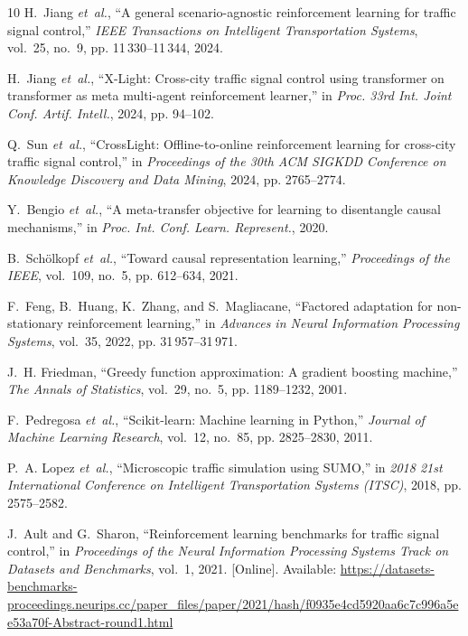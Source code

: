 \documentclass[letterpaper,journal]{IEEEtran}
\begin{document}
\begin{thebibliography}{10}
H.~Jiang \emph{et~al.}, ``A general
  scenario-agnostic reinforcement learning for traffic signal control,''
  \emph{IEEE Transactions on Intelligent Transportation Systems}, vol.~25,
  no.~9, pp. 11\,330--11\,344, 2024.

H.~Jiang \emph{et~al.}, ``{X-Light}: Cross-city traffic signal control using transformer on transformer as meta multi-agent reinforcement learner,'' in \emph{Proc. 33rd Int. Joint Conf. Artif. Intell.}, 2024, pp. 94--102.

Q.~Sun \emph{et~al.}, ``{CrossLight}:
  Offline-to-online reinforcement learning for cross-city traffic signal
  control,'' in \emph{Proceedings of the 30th ACM SIGKDD Conference on
  Knowledge Discovery and Data Mining}, 2024, pp. 2765--2774.

Y.~Bengio \emph{et~al.}, ``A meta-transfer objective for learning to disentangle causal mechanisms,'' in \emph{Proc. Int. Conf. Learn. Represent.}, 2020.

B.~Sch{\"o}lkopf \emph{et~al.}, ``Toward causal representation learning,'' \emph{Proceedings of the IEEE}, vol.~109, no.~5, pp. 612--634, 2021.

F.~Feng, B.~Huang, K.~Zhang, and S.~Magliacane, ``Factored adaptation for non-stationary reinforcement learning,'' in \emph{Advances in Neural Information Processing Systems}, vol.~35, 2022, pp. 31\,957--31\,971.

J.~H. Friedman, ``Greedy function approximation: A gradient boosting machine,''
  \emph{The Annals of Statistics}, vol.~29, no.~5, pp. 1189--1232, 2001.

F.~Pedregosa \emph{et~al.}, ``Scikit-learn: Machine learning in {Python},'' \emph{Journal of Machine Learning Research}, vol.~12, no.~85, pp. 2825--2830, 2011.

P.~A. Lopez \emph{et~al.}, ``Microscopic traffic simulation using {SUMO},'' in \emph{2018 21st
  International Conference on Intelligent Transportation Systems (ITSC)}, 2018,
  pp. 2575--2582.

\BIBentryALTinterwordspacing
J.~Ault and G.~Sharon, ``Reinforcement learning benchmarks for traffic signal
  control,'' in \emph{Proceedings of the Neural Information Processing Systems
  Track on Datasets and Benchmarks}, vol.~1, 2021. [Online]. Available:
  \url{https://datasets-benchmarks-proceedings.neurips.cc/paper_files/paper/2021/hash/f0935e4cd5920aa6c7c996a5ee53a70f-Abstract-round1.html}
\BIBentrySTDinterwordspacing


\end{thebibliography}
\end{document}
